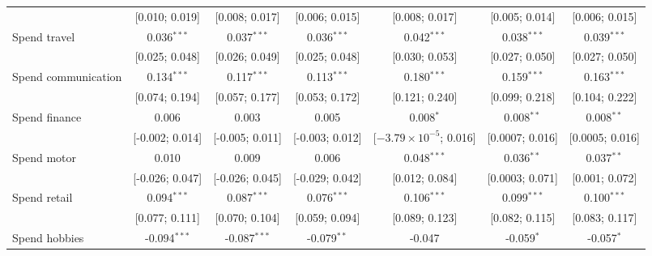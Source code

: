 \begin{table}[htbp]
\begin{threeparttable}[b]
\begin{tabular}{lcccccc}
                                   & [0.010; 0.019]                  & [0.008; 0.017]   & [0.006; 0.015]    & [0.008; 0.017]                  & [0.005; 0.014]    & [0.006; 0.015]\\   
         Spend travel              & 0.036$^{***}$                   & 0.037$^{***}$    & 0.036$^{***}$     & 0.042$^{***}$                   & 0.038$^{***}$     & 0.039$^{***}$\\   
                                   & [0.025; 0.048]                  & [0.026; 0.049]   & [0.025; 0.048]    & [0.030; 0.053]                  & [0.027; 0.050]    & [0.027; 0.050]\\   
         Spend communication       & 0.134$^{***}$                   & 0.117$^{***}$    & 0.113$^{***}$     & 0.180$^{***}$                   & 0.159$^{***}$     & 0.163$^{***}$\\   
                                   & [0.074; 0.194]                  & [0.057; 0.177]   & [0.053; 0.172]    & [0.121; 0.240]                  & [0.099; 0.218]    & [0.104; 0.222]\\   
         Spend finance             & 0.006                           & 0.003            & 0.005             & 0.008$^{*}$                     & 0.008$^{**}$      & 0.008$^{**}$\\   
                                   & [-0.002; 0.014]                 & [-0.005; 0.011]  & [-0.003; 0.012]   & [$-3.79\times 10^{-5}$; 0.016]  & [0.0007; 0.016]   & [0.0005; 0.016]\\   
         Spend motor               & 0.010                           & 0.009            & 0.006             & 0.048$^{***}$                   & 0.036$^{**}$      & 0.037$^{**}$\\   
                                   & [-0.026; 0.047]                 & [-0.026; 0.045]  & [-0.029; 0.042]   & [0.012; 0.084]                  & [0.0003; 0.071]   & [0.001; 0.072]\\   
         Spend retail              & 0.094$^{***}$                   & 0.087$^{***}$    & 0.076$^{***}$     & 0.106$^{***}$                   & 0.099$^{***}$     & 0.100$^{***}$\\   
                                   & [0.077; 0.111]                  & [0.070; 0.104]   & [0.059; 0.094]    & [0.089; 0.123]                  & [0.082; 0.115]    & [0.083; 0.117]\\   
         Spend hobbies             & -0.094$^{***}$                  & -0.087$^{***}$   & -0.079$^{**}$     & -0.047                          & -0.059$^{*}$      & -0.057$^{*}$\\   

\end{tabular}
\end{threeparttable}
\end{table}

